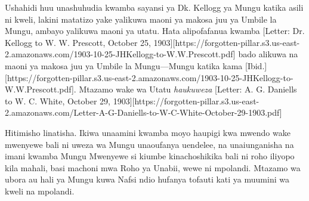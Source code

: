 Ushahidi huu unashuhudia kwamba sayansi ya Dk. Kellogg ya Mungu katika asili ni kweli, lakini matatizo yake yalikuwa maoni ya makosa juu ya Umbile la Mungu, ambayo yalikuwa maoni ya utatu. Hata alipofafanua kwamba [Letter: Dr. Kellogg to W. W. Prescott, October 25, 1903][https://forgotten-pillar.s3.us-east-2.amazonaws.com/1903-10-25-JHKellogg-to-W.W.Prescott.pdf] bado alikuwa na maoni ya makosa juu ya Umbile la Mungu—Mungu katika  kama [Ibid.][https://forgotten-pillar.s3.us-east-2.amazonaws.com/1903-10-25-JHKellogg-to-W.W.Prescott.pdf]. Mtazamo wake wa Utatu \textit{haukuweza} [Letter: A. G. Daniells to W. C. White, October 29, 1903][https://forgotten-pillar.s3.us-east-2.amazonaws.com/Letter-A-G-Daniells-to-W-C-White-October-29-1903.pdf]


Hitimisho linatisha. Ikiwa unaamini kwamba moyo haupigi kwa mwendo wake mwenyewe bali ni uweza wa Mungu unaoufanya uendelee, na unaiunganisha na imani kwamba Mungu Mwenyewe si kiumbe kinachoshikika bali ni roho iliyopo kila mahali, basi machoni mwa Roho ya Unabii, wewe ni mpolandi. Mtazamo wa ubora au hali ya Mungu kuwa Nafsi ndio hufanya tofauti kati ya muumini wa kweli na mpolandi.



